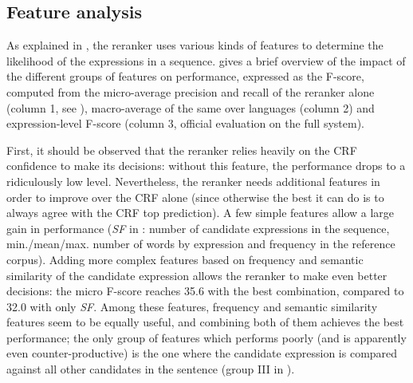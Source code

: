 \documentclass[output=paper,modfonts,nonflat]{langsci/langscibook}
\begin{document}
\subsection{Feature analysis}
\label{moreau:sec:featuresAnalysis}


As explained in , the reranker uses various kinds of
features to determine the likelihood of the expressions in a
sequence.  gives a brief overview of
the impact of the different groups of features on performance,
expressed as the F-score, computed from the micro-average precision
and recall of the reranker alone (column 1, see
), macro-average of the same over languages
(column 2) and expression-level F-score (column 3, official evaluation
on the full system).

First, it should be observed that the reranker relies heavily on the
CRF confidence to make its decisions: without this feature, the
performance drops to a ridiculously low level. Nevertheless, the
reranker needs additional features in order to improve over the CRF
alone (since otherwise the best it can do is to always agree with the
CRF top prediction). A few simple features allow a large gain in performance ({\em SF} in 
: number of candidate expressions in the
sequence, min./mean/max. number of words by expression and frequency
in the reference corpus). Adding more
complex features based on frequency and semantic similarity of the
candidate expression allows the reranker to make even better decisions:
the micro F-score reaches 35.6 with the best combination, compared to
32.0 with only {\em SF}. Among these features, frequency and semantic
similarity features seem to be equally useful, and combining both of them
achieves the best performance; the only group of features which
performs poorly (and is apparently even counter-productive) is the one
where the candidate expression is compared against all
other candidates in the sentence (group III in
).
\end{document}
